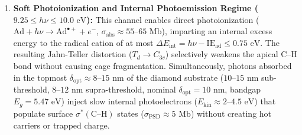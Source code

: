 \documentclass[10pt,twocolumn,a4paper]{article}
\begin{document}
\begin{enumerate}
    \item \textbf{Soft Photoionization and Internal Photoemission Regime ($9.25 \le h\nu \le 10.0\text{ eV}$):} This channel enables direct photoionization ($\text{Ad} + h\nu \to \text{Ad}^{\bullet+} + e^-$, $\sigma_{\text{abs}} \approx 55\text{--}65\text{ Mb}$), imparting an internal excess energy to the radical cation of at most $\Delta E_{\text{int}} = h\nu - \text{IE}_{\text{ad}} \le 0.75\text{ eV}$. The resulting Jahn-Teller distortion ($T_d \to C_{3v}$) selectively weakens the apical $\text{C--H}$ bond without causing cage fragmentation. Simultaneously, photons absorbed in the topmost $\delta_{\text{opt}} \approx 8\text{--}15\text{ nm}$ of the diamond substrate ($10\text{--}15\text{ nm}$ sub-threshold, $8\text{--}12\text{ nm}$ supra-threshold, nominal $\delta_{\text{opt}} = 10\text{ nm}$, bandgap $E_g = 5.47\text{ eV}$) inject slow internal photoelectrons ($E_{\text{kin}} \approx 2\text{--}4.5\text{ eV}$) that populate surface $\sigma^*(\text{C--H})$ states ($\sigma_{\text{PSD}} \approx 5\text{ Mb}$) without creating hot carriers or trapped charge.
\end{enumerate}
\end{document}
